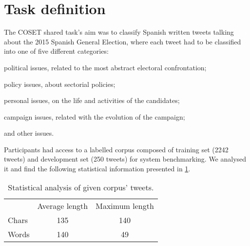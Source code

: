 \section{Task definition} \label{sec:task}

The COSET shared task's \cite{gimenez2017overview} aim was to classify Spanish written tweets talking about the 2015 Spanish General Election, where each tweet had to be classified into one of five different categories:
\begin{enumerate*}
\item political issues, related to the most abstract electoral confrontation; 
\item policy issues, about sectorial policies; 
\item personal issues, on the life and activities of the candidates; 
\item campaign issues, related with the evolution of the campaign;
\item and other issues.
\end{enumerate*}


Participants had access to a labelled corpus composed of training set (2242 tweets) and development set (250 tweets) for system benchmarking. We analysed it and find the following statistical information presented in \cref{tab:corpus}.

\begin{comment}
\begin{table}[h]
\footnotesize
\centering
\begin{tabular}{l|cc}
\toprule
\hline
			& Average length	& Maximum length	\\ \hline
Chars		& 135				& 140				\\ 
Words		& 140				& 49				\\ 
\hline
\bottomrule
\end{tabular}
\caption{Statistical analysis of given corpus' tweets.}
\label{tab:corpusOLD}
\end{table}
\end{comment}


\begin{table}[h]
	\centering
	\caption{Statistical analysis of given corpus' tweets.}
	\label{tab:corpus}
	\begin{tabular}{l|cc}
		\hline\noalign{\smallskip}
					& Average length	& Maximum length	\\
		\noalign{\smallskip}
		\hline
		\noalign{\smallskip}
		Chars		& 135				& 140				\\ 
		Words		& 140				& 49				\\ 
		\hline
	\end{tabular}
\end{table}